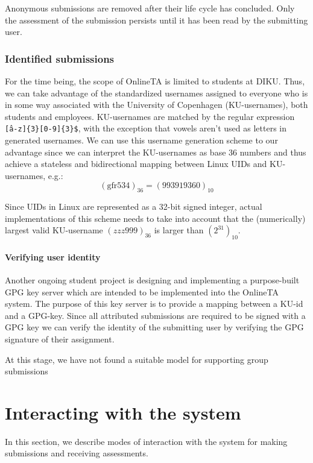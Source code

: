 Anonymous submissions are removed after their life cycle has
concluded. Only the assessment of the submission persists until it has
been read by the submitting user.


\subsubsection{Identified submissions}
For the time being, the scope of OnlineTA is limited to students at
DIKU. Thus, we can take advantage of the standardized usernames
assigned to everyone who is in some way associated with the University
of Copenhagen (KU-usernames), both students and
employees. KU-usernames are matched by the regular expression
\texttt{\^[a-z]\{3\}[0-9]\{3\}\$}, with the exception that vowels aren't used
as letters in generated usernames. We can use this
username generation scheme to our advantage since we can interpret the
KU-usernames as base 36 numbers and thus achieve a stateless and
bidirectional mapping between Linux UIDs and KU-usernames, e.g.:
\begin{equation*}
(\text{gfr534})_{36} = (993919360)_{10}
\end{equation*}

Since UIDs in Linux are represented as a 32-bit signed integer, actual
implementations of this scheme needs to take into account that the
(numerically) largest valid KU-username $(zzz999)_{36}$ is larger than
$(2^{31})_{10}$.

\paragraph{Verifying user identity}
Another ongoing student project is designing and implementing a
purpose-built GPG key server which are intended to be implemented into
the OnlineTA system. The purpose of this key server is to provide a
mapping between a KU-id and a GPG-key. Since all attributed
submissions are required to be signed with a GPG key we can verify the
identity of the submitting user by verifying the GPG signature of
their assignment.

At this stage, we have not found a suitable model for supporting group
submissions


\section{Interacting with the system}
In this section, we describe modes of interaction with the system for
making submissions and receiving assessments.

